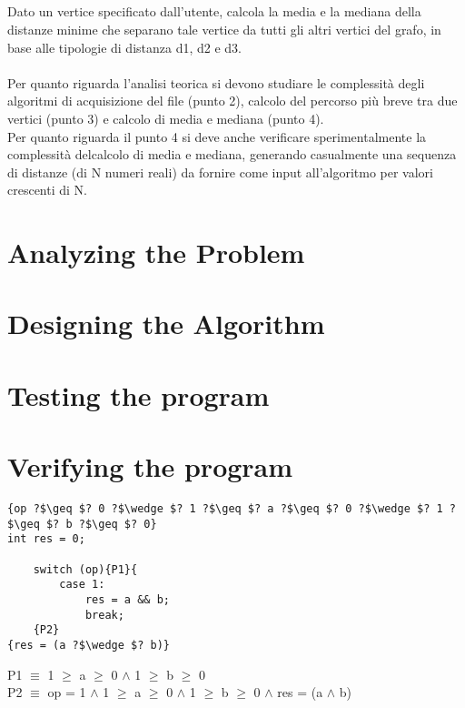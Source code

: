 \documentclass[11pt, a4paper, titlepage, block]{article}
\begin{document}
	\subsection{}
	Dato un vertice specificato dall’utente, calcola la media e la mediana della distanze minime che separano tale vertice da tutti gli altri vertici del grafo, in base alle tipologie di distanza d1, d2 e d3.\\ \\
	Per quanto riguarda l’analisi teorica si devono studiare le complessit\`{a} degli algoritmi di acquisizione del file (punto 2), calcolo del percorso pi\`{u} breve tra due vertici (punto 3) e calcolo di media e mediana (punto 4).\\
	Per quanto riguarda il punto 4 si deve anche verificare sperimentalmente la complessit\`{a} delcalcolo di media e mediana, generando casualmente una sequenza di distanze (di N numeri reali) da fornire come input all’algoritmo per valori crescenti di N.

	\newpage
\section{Analyzing the Problem}
	
	
	\newpage			
\section{Designing the Algorithm}

	\newpage
\section{Testing the program}

	\newpage
\section{Verifying the program}
\lstset{numbers=left, tabsize=2, escapechar=?}
\begin{lstlisting}
{op ?$\geq $? 0 ?$\wedge $? 1 ?$\geq $? a ?$\geq $? 0 ?$\wedge $? 1 ?$\geq $? b ?$\geq $? 0}
int res = 0;
	
	switch (op){P1}{
		case 1:
			res = a && b;
			break;
	{P2}
{res = (a ?$\wedge $? b)}

\end{lstlisting}
P1 $\equiv $ 1 $\geq $ a $\geq $ 0 $\wedge $ 1 $\geq $ b $\geq $ 0\\
P2 $\equiv $ op = 1 $\wedge $ 1 $\geq $ a $\geq $ 0 $\wedge $ 1 $\geq $ b $\geq $ 0 $\wedge $ res = (a $\wedge $ b)\\
\\
\end{document}
